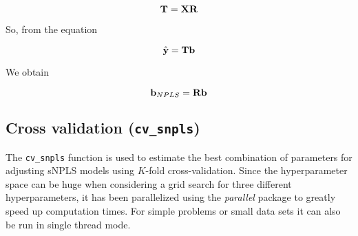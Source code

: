 \begin{equation}
    \textbf{\text{T}}=\textbf{\text{XR}}
\end{equation}

So, from the equation

\begin{equation}
    \hat{\textbf{\text{y}}}=\textbf{\text{Tb}}
\end{equation}

We obtain

\begin{equation}
    \textbf{\text{b}}_{NPLS}=\textbf{\text{Rb}}
\end{equation}

\subsection{Cross validation (\texttt{cv\_snpls})}
The \texttt{cv\_snpls} function is used to estimate the best combination of parameters for adjusting sNPLS models using $K$-fold cross-validation. Since the hyperparameter space can be huge when considering a grid search for three different hyperparameters, it has been parallelized using the \textit{parallel} package to greatly speed up computation times. For simple problems or small data sets it can also be run in single thread mode.
\vspace{15pt}
